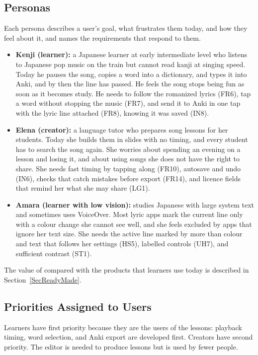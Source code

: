 \documentclass[12pt]{article}
\begin{document}
\subsection{Personas}
Each persona describes a user's goal, what frustrates them today, and how
they feel about it, and names the requirements that respond to them.
\begin{itemize}
    \item \textbf{Kenji (learner):} a Japanese learner at early intermediate
          level who listens to Japanese pop music on the train but cannot read
          kanji at singing speed. Today he pauses the song, copies a word into a
          dictionary, and types it into Anki, and by then the line has passed.
          He feels the song stops being fun as soon as it becomes study. He
          needs to follow the romanized lyrics (FR6), tap a word without
          stopping the music (FR7), and send it to Anki in one tap with the
          lyric line attached (FR8), knowing it was saved (IN8).
    \item \textbf{Elena (creator):} a language tutor who prepares song lessons
          for her students. Today she builds them in slides with no timing,
          and every student has to search the song again. She worries about
          spending an evening on a lesson and losing it, and about using
          songs she does not have the right to share. She needs fast timing by
          tapping along (FR10), autosave and undo (IN6), checks that catch
          mistakes before export (FR14), and licence fields that remind her
          what she may share (LG1).
    \item \textbf{Amara (learner with low vision):} studies Japanese with large
          system text and sometimes uses VoiceOver. Most lyric apps mark the
          current line only with a colour change she cannot see well, and she
          feels excluded by apps that ignore her text size. She needs the
          active line marked by more than colour and text that follows her
          settings (HS5), labelled controls (UH7), and sufficient contrast
          (ST1).
\end{itemize}

The value of \progname{} compared with the products that learners use today is
described in Section~\ref{SecReadyMade}.

\subsection{Priorities Assigned to Users}
Learners have first priority because they are the users of the lessons:
playback timing, word selection, and Anki export are developed first. Creators
have second priority. The editor is needed to produce lessons but is used by
fewer people.
\end{document}
